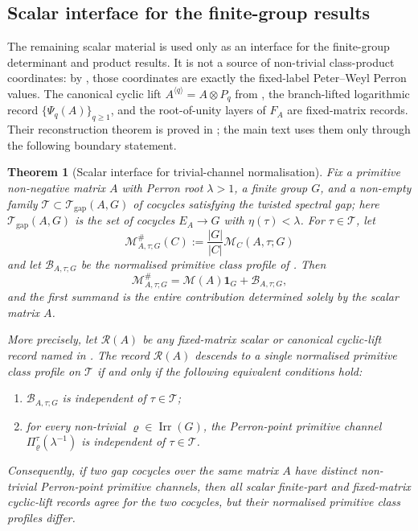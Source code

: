 \documentclass[11pt,a4paper]{amsart}
\theoremstyle{plain}
\newtheorem{theorem}{Theorem}[section]
\theoremstyle{definition}
\theoremstyle{remark}
\DeclareMathOperator{\Irr}{Irr}
\begin{document}
\subsection{Scalar interface for the finite-group results}

The remaining scalar material is used only as an interface for the
finite-group determinant and product results. It is not a source of
non-trivial class-product coordinates: by
, those coordinates are exactly
the fixed-label Peter--Weyl Perron values. The canonical cyclic lift
\(A^{\langle q\rangle}=A\otimes P_q\) from , the
branch-lifted logarithmic record \(\{\Psi_q(A)\}_{q\ge1}\), and the
root-of-unity layers of \(F_A\) are fixed-matrix records. Their
reconstruction theorem is proved in ; the
main text uses them only through the following boundary statement.

\begin{theorem}[Scalar interface for trivial-channel normalisation]
  \label{thm:finite-part-scalar-interface-no-descent}
  Fix a primitive non-negative matrix \(A\) with Perron root
  \(\lambda>1\), a finite group \(G\), and a non-empty family
  \(\mathscr T\subset\mathcal T_{\mathrm{gap}}(A,G)\) of cocycles
  satisfying the twisted spectral gap; here
  \(\mathcal T_{\mathrm{gap}}(A,G)\) is the set of cocycles
  \(E_A\to G\) with \(\eta(\tau)<\lambda\). For
  \(\tau\in\mathscr T\), let
  \[
    \mathcal M^\#_{A,\tau;G}(C):=\frac{|G|}{|C|}\mathcal M_C(A,\tau;G)
  \]
  and let \(\mathcal B_{A,\tau;G}\) be the normalised primitive class
  profile of . Then
  \begin{equation}\label{eq:finite-part-scalar-interface-splitting}
    \mathcal M^\#_{A,\tau;G}
    =
    \mathcal M(A)\mathbf 1_G+
    \mathcal B_{A,\tau;G},
  \end{equation}
  and the first summand is the entire contribution determined solely by
  the scalar matrix \(A\).

  More precisely, let \(\mathcal R(A)\) be any fixed-matrix scalar or
  canonical cyclic-lift record named in .
  The record \(\mathcal R(A)\)
  descends to a single normalised primitive class profile on
  \(\mathscr T\) if and only if the following equivalent conditions hold:
  \begin{enumerate}[label=\textup{(\roman*)}]
    \item \(\mathcal B_{A,\tau;G}\) is independent of
      \(\tau\in\mathscr T\);
    \item for every non-trivial \(\varrho\in\Irr(G)\), the Perron-point
      primitive channel \(\Pi_\varrho^\tau(\lambda^{-1})\) is independent
      of \(\tau\in\mathscr T\).
  \end{enumerate}
  Consequently, if two gap cocycles over the same matrix \(A\) have
  distinct non-trivial Perron-point primitive channels, then all scalar
  finite-part and fixed-matrix cyclic-lift records agree for the two
  cocycles, but their normalised primitive class profiles differ.
\end{theorem}
\end{document}
